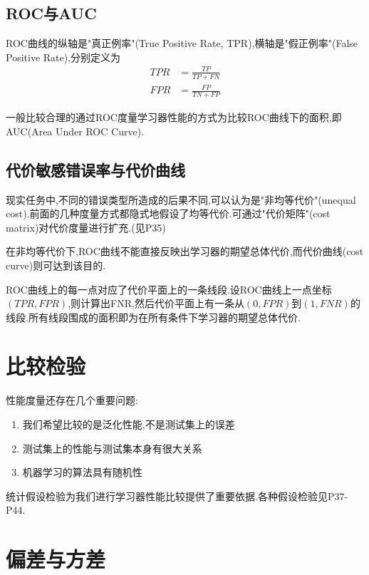 \subsection{ROC与AUC}

ROC曲线的纵轴是"真正例率"(True Positive Rate, TPR),横轴是"假正例率"(False Positive Rate),分别定义为
\begin{equation}\begin{split}
TPR&=\frac{TP}{TP+FN}\\
FPR&=\frac{FP}{TN+FP}
\end{split}\end{equation}

一般比较合理的通过ROC度量学习器性能的方式为比较ROC曲线下的面积,即AUC(Area Under ROC Curve).

\subsection{代价敏感错误率与代价曲线}

现实任务中,不同的错误类型所造成的后果不同,可以认为是"非均等代价"(unequal cost).前面的几种度量方式都隐式地假设了均等代价.可通过"代价矩阵"(cost matrix)对代价度量进行扩充.(见P35)

在非均等代价下,ROC曲线不能直接反映出学习器的期望总体代价,而代价曲线(cost curve)则可达到该目的.

ROC曲线上的每一点对应了代价平面上的一条线段.设ROC曲线上一点坐标$(TPR,FPR)$,则计算出FNR,然后代价平面上有一条从$(0,FPR)$到$(1,FNR)$的线段.所有线段围成的面积即为在所有条件下学习器的期望总体代价.

\section{比较检验}

性能度量还存在几个重要问题:

\begin{enumerate}
\item 我们希望比较的是泛化性能,不是测试集上的误差
\item 测试集上的性能与测试集本身有很大关系
\item 机器学习的算法具有随机性
\end{enumerate}

统计假设检验为我们进行学习器性能比较提供了重要依据.各种假设检验见P37-P44.

\section{偏差与方差}

